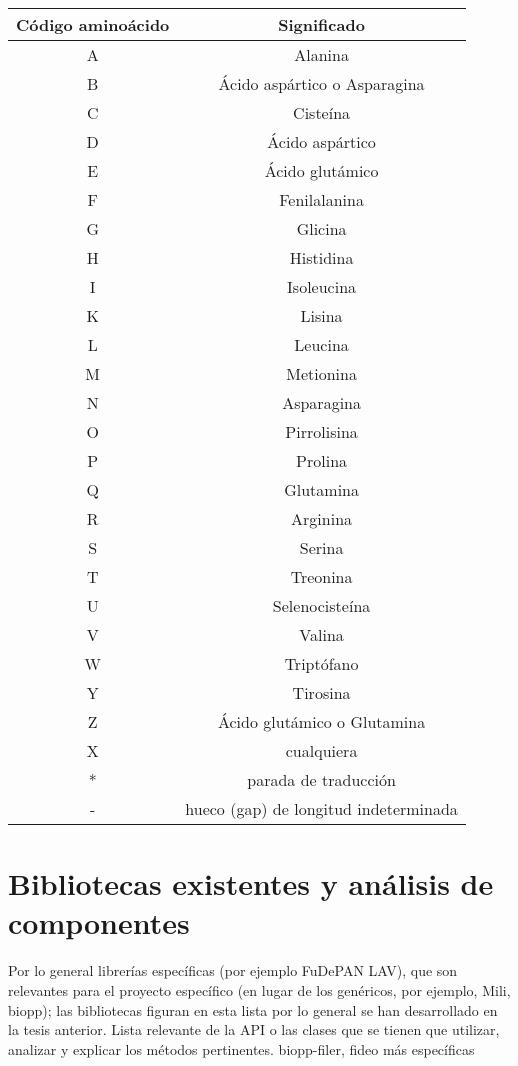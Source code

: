 \documentclass[12pt,a4paper,spanish]{article}
\begin{document}
\begin{itemize}
					\begin{center}
						\begin{tabular}{| c | c |}
							\hline
							{\bf Código aminoácido} & {\bf Significado} \\
							\hline
							\hline		
							A &	Alanina \\\hline
							B & Ácido aspártico o Asparagina \\\hline
							C &	Cisteína \\\hline
							D &	Ácido aspártico \\\hline
							E &	Ácido glutámico \\\hline
							F &	Fenilalanina \\\hline
							G &	Glicina \\\hline
							H &	Histidina \\\hline
							I & Isoleucina \\\hline
							K &	Lisina \\\hline
							L &	Leucina \\\hline
							M & Metionina \\\hline
							N &	Asparagina \\\hline
							O &	Pirrolisina \\\hline
							P &	Prolina \\\hline
							Q &	Glutamina \\\hline
							R &	Arginina \\\hline
							S &	Serina \\\hline
							T &	Treonina \\\hline
							U &	Selenocisteína \\\hline
							V &	Valina \\\hline
							W &	Triptófano \\\hline
							Y &	Tirosina \\\hline
							Z &	Ácido glutámico o Glutamina \\\hline
							X &	cualquiera \\\hline
							* &	parada de traducción \\\hline
							- &	hueco (gap) de longitud indeterminada \\\hline
						\end{tabular}
					\end{center}	
			 \end{itemize}

		
		
\section{Bibliotecas existentes y análisis de componentes}
	Por lo general librerías específicas (por ejemplo FuDePAN
	LAV), que son relevantes para el proyecto específico (en lugar de los genéricos, por ejemplo, Mili, biopp);
	las bibliotecas figuran en esta lista por lo general se han desarrollado en la tesis anterior. Lista relevante de la API
	o las clases que se tienen que utilizar, analizar y explicar los métodos pertinentes.
	biopp-filer, fideo más específicas
	
\end{document}
